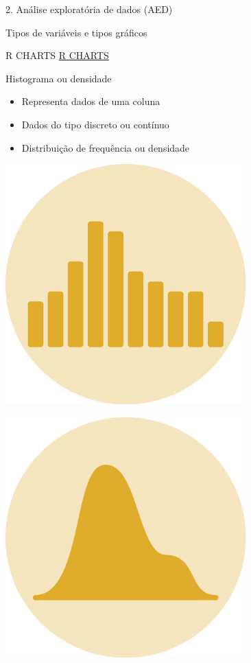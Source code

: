 \documentclass[
  ignorenonframetext,
]{beamer}
\begin{document}
\begin{frame}[fragile]{2. Análise exploratória de dados (AED)}
\begin{block}{Tipos de variáveis e tipos gráficos}
\protect\hypertarget{tipos-de-variuxe1veis-e-tipos-gruxe1ficos-1}{}
\end{block}

\begin{block}{R CHARTS}
\protect\hypertarget{r-charts}{}
\href{https://r-charts.com/}{R CHARTS}
\end{block}

\begin{block}{Histograma ou densidade}
\protect\hypertarget{histograma-ou-densidade}{}
\begin{itemize}
\item
  Representa dados de uma coluna
\item
  Dados do tipo discreto ou contínuo
\item
  Distribuição de frequência ou densidade
\end{itemize}

\includegraphics[width=3.64583in,height=3.64583in]{img/plot_histogram.png}

\includegraphics[width=3.64583in,height=3.64583in]{img/plot_density.png}


\end{block}
\end{frame}
\end{document}
